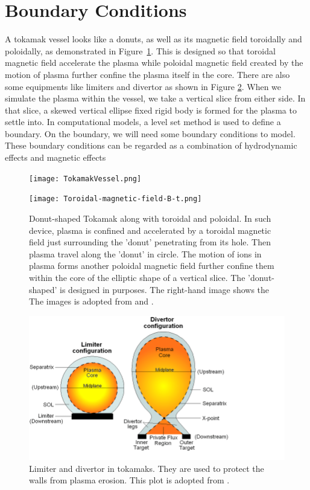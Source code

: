 \section{Boundary Conditions}
\label{section2.3}
A tokamak vessel looks like a donuts, as well as its magnetic field toroidally and poloidally, as demonstrated in  Figure~\ref{fig:TokamakDonut}. This is designed so that toroidal magnetic field accelerate the plasma while poloidal magnetic field created by the motion of plasma further confine the plasma itself in the core. There are also some equipments like limiters and divertor as shown in Figure \ref{fig:LimiterDivertor}. When we simulate the plasma within the vessel, we take a vertical slice from either side. In that slice, a skewed vertical ellipse fixed rigid body is formed for the plasma to settle into. In computational models, a level set method \cite{andrew2000level} is used to define a boundary. On the boundary, we will need some boundary conditions to model. These boundary conditions can be regarded as a combination of hydrodynamic effects and magnetic effects 
\begin{figure}[H]
    \centering
    \begin{minipage}{0.49\textwidth}
  \texttt{[image: TokamakVessel.png]}
\end{minipage}
\begin{minipage}{0.49\textwidth}
  \texttt{[image: Toroidal-magnetic-field-B-t.png]}
\end{minipage}
    \caption[Donut-shaped Tokamak and magnetic field]{Donut-shaped Tokamak along with toroidal and poloidal. In such device, plasma is confined and accelerated by a toroidal magnetic field just surrounding the 'donut' penetrating from its hole. Then plasma travel along the 'donut' in circle. The motion of ions in plasma forms another poloidal magnetic field further confine them within the core of the elliptic shape of a vertical slice. The 'donut-shaped' is designed in purposes. The right-hand image shows the  The images is adopted from \cite{moynihan2023fusion} and \cite{twarog2011test}. }
    \label{fig:TokamakDonut}
\end{figure}
\begin{figure}
    \centering
    \includegraphics[width=0.5 \textwidth]{Chapter2/Figs/limiter_and_divertor.png}
    \caption[Limiter and divertor in tokamaks]{Limiter and divertor in tokamaks. They are used to protect the walls from plasma erosion. This plot is adopted from \cite{kumar2021analysis}.}
    \label{fig:LimiterDivertor}
\end{figure}


